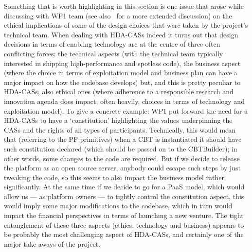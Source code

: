 
Something that is worth highlighting in this section is one issue that arose while discussing with WP1 team (see also~\cite{D1.2} for a more extended discussion) on the ethical implications of some of the design choices that were taken by the project's technical team. When dealing with HDA-CASs indeed it turns out that design decisions in terms of enabling technology are at the centre of three often conflicting forces: the technical aspects (with the technical team typically interested in shipping high-performance and spotless code), the business aspect (where the choice in terms of exploitation model and business plan can have a major impact on how the codebase develops) but, and this is pretty peculiar to HDA-CASs, also ethical ones (where adherence to a responsible research and innovation agenda does impact, often heavily, choices in terms of technology and exploitation model). To give a concrete example: WP1 put forward the need for a HDA-CASs to have a `constitution' highlighting the values underpinning the CASs and the rights of all types of participants. Technically, this would mean that (referring to the PF primitives) when a CBT is instantiated it should have such constitution declared (which should be passed on to the CBTBuilder); in other words, some changes to the code are required. But if we decide to release the platform as an open source server, anybody could escape such steps by just tweaking the code, so this seems to also impact the business model rather significantly. At the same time if we decide to go for a PaaS model, which would allow us --- as platform owners --- to tightly control the constitution aspect, this would imply some major modifications to the codebase, which in turn would impact the financial perspectives in terms of launching a new venture. The tight entanglement of these three aspects (ethics, technology and business) appears to be probably the most challenging aspect of HDA-CASs, and certainly one of the major take-aways of the project. 

